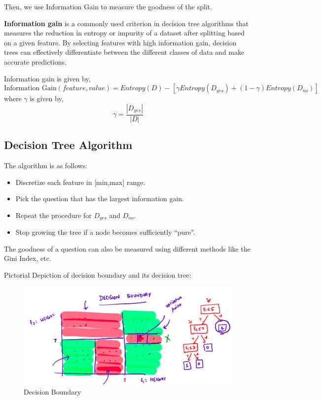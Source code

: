 \documentclass[
]{article}
\providecommand{\tightlist}{%
  \setlength{\itemsep}{0pt}\setlength{\parskip}{0pt}}
\begin{document}
Then, we use Information Gain to measure the goodness of the split.

\textbf{Information gain} is a commonly used criterion in decision tree
algorithms that measures the reduction in entropy or impurity of a
dataset after splitting based on a given feature. By selecting features
with high information gain, decision trees can effectively differentiate
between the different classes of data and make accurate predictions.

Information gain is given by, \[
\text{Information Gain}(feature,value)=Entropy(D) - \left [ \gamma Entropy(D_{yes})+(1-\gamma)Entropy(D_{no}) \right ]
\] where \(\gamma\) is given by, \[
\gamma=\frac{|D_{yes}|}{|D|}
\]

\hypertarget{decision-tree-algorithm}{%
\subsection{Decision Tree Algorithm}\label{decision-tree-algorithm}}

The algorithm is as follows:

\begin{itemize}
\tightlist
\item
  Discretize each feature in {[}min,max{]} range.
\item
  Pick the question that has the largest information gain.
\item
  Repeat the procedure for \(D_{yes}\) and \(D_{no}\).
\item
  Stop growing the tree if a node becomes sufficiently ``pure''.
\end{itemize}

The goodness of a question can also be measured using different methods
like the Gini Index, etc.

Pictorial Depiction of decision boundary and its decision tree:

\begin{figure}
\centering
\includegraphics{./images/decision_bound.png}
\caption{Decision Boundary}
\end{figure}
\end{document}
